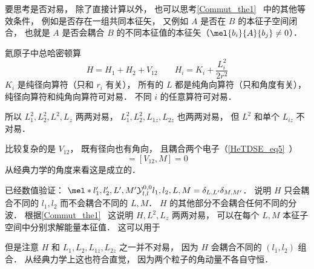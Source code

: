 
要思考是否对易， 除了直接计算以外， 也可以思考\autoref{Commut_the1}~ 中的其他等效条件， 例如是否存在一组共同本征矢， 又例如 $A$ 是否在 $B$ 的本征子空间闭合， 也就是 $A$ 是否会耦合 $B$ 的不同本征值的本征矢（$\mel{b_i}{A}{b_j} \ne 0$）．

氦原子中总哈密顿算
\begin{equation}
H = H_1 + H_2 + V_{12} \qquad H_i = K_i + \frac{L_i^2}{2r^2}
\end{equation}
$K_i$ 是纯径向算符（只和 $r_i$ 有关）， 所有的 $L$ 都是纯角向算符（只和角度有关）， 纯径向算符和纯角向算符可对易． 不同 $i$ 的任意算符可对易．

所以 $L_1^2, L_2^2, L^2, L_z$ 两两对易， $L_1^2, L_2^2, L_{1z}, L_{2z}$ 也两两对易， 但 $L^2$ 和单个 $L_{iz}$ 不对易．

比较复杂的是 $V_{12}$， 既有径向也有角向， 且耦合两个电子（\autoref{HeTDSE_eq5}~）
\begin{equation}
[V_{12}, L^2] = [V_{12}, M] = 0
\end{equation}
从经典力学的角度来看这是成立的．

已经数值验证： $\mel*{l'_1,l'_2,L',M'}{\mathcal Y_{l,l}^{0,0}}{l_1,l_2,L,M} = \delta_{L,L'}\delta_{M,M'}$． 说明 $H$ 只会耦合不同的 $l_1,l_2$ 而不会耦合不同的 $L,M$． $H$ 的其他部分不会耦合任何不同的分波． 根据\autoref{Commut_the1}~ 这说明 $H,L^2,L_z$ 两两对易， 可以在每个 $L,M$ 本征子空间中分别求解能量本征值． 这可以用于

但是注意 $H$ 和 $L_1, L_2, L_{1z}, L_{2z}$ 之一并不对易， 因为 $H$ 会耦合不同的 $(l_1,l_2)$ 组合． 从经典力学上这也符合直觉， 因为两个粒子的角动量不各自守恒．



